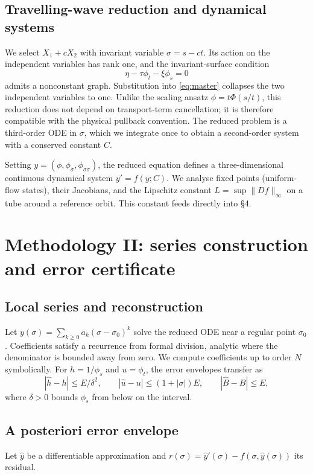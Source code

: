 \documentclass[12pt,a4paper]{article}
\begin{document}
\subsection*{Travelling-wave reduction and dynamical systems}
We select $X_1+cX_2$ with invariant variable $\sigma=s-ct$. Its action on the independent variables has rank one, and the invariant-surface condition
\[
\eta-\tau\phi_t-\xi\phi_s=0
\]
admits a nonconstant graph. Substitution into \eqref{eq:master} collapses the two independent variables to one. Unlike the scaling ansatz $\phi=t\Phi(s/t)$, this reduction does not depend on transport-term cancellation; it is therefore compatible with the physical pullback convention. The reduced problem is a third-order ODE in $\sigma$, which we integrate once to obtain a second-order system with a conserved constant $C$.

Setting $y=(\phi,\phi_\sigma,\phi_{\sigma\sigma})$, the reduced equation defines a three-dimensional continuous dynamical system $y'=f(y;C)$. We analyse fixed points (uniform-flow states), their Jacobians, and the Lipschitz constant $L=\sup\|Df\|_\infty$ on a tube around a reference orbit. This constant feeds directly into \S4.

\section{Methodology II: series construction and error certificate}

\subsection*{Local series and reconstruction}
Let $y(\sigma)=\sum_{k\ge 0}a_k(\sigma-\sigma_0)^k$ solve the reduced ODE near a regular point $\sigma_0$. Coefficients satisfy a recurrence from formal division, analytic where the denominator is bounded away from zero. We compute coefficients up to order $N$ symbolically. For $h=1/\phi_s$ and $u=\phi_t$, the error envelopes transfer as
\[
|\hat h-h|\le E/\delta^2,\qquad
|\hat u-u|\le(1+|\sigma|)E,\qquad
|\hat B-B|\le E,
\]
where $\delta>0$ bounds $\phi_s$ from below on the interval.

\subsection*{A posteriori error envelope}
Let $\hat y$ be a differentiable approximation and $r(\sigma)=\hat y'(\sigma)-f(\sigma,\hat y(\sigma))$ its residual.
\end{document}
